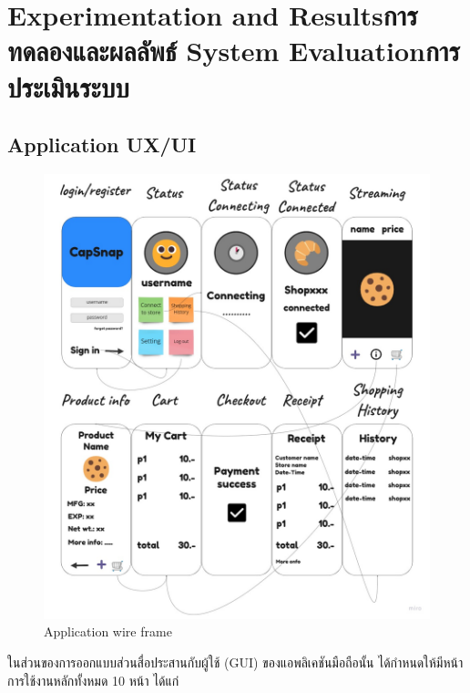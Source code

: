 \chapter{\ifproject%
\ifenglish Experimentation and Results\else การทดลองและผลลัพธ์\fi
\else%
\ifenglish System Evaluation\else การประเมินระบบ\fi
\fi}

\section{Application UX/UI}
\begin{figure}[h]
    \begin{center}
   
    \includegraphics[scale=0.25]{pic/ui/mobileui.jpg}
    \end{center}
    
    \caption[Application wire frame]{Application wire frame}
    \label{fig:Application wire frame}
    \end{figure} 

ในส่วนของการออกแบบส่วนสื่อประสานกับผู้ใช้ (GUI) ของแอพลิเคชันมือถือนั้น ได้กำหนดให้มีหน้าการใช้งานหลักทั้งหมด 10 หน้า ได้แก่
 
